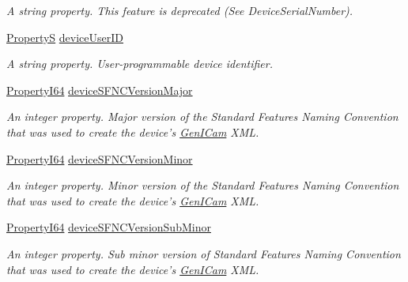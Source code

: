 \begin{DoxyCompactItemize}
\begin{DoxyCompactList}\small\item\em A string property. This feature is deprecated (See Device\+Serial\+Number). \end{DoxyCompactList}\item 
\hyperlink{classmv_i_m_p_a_c_t_1_1acquire_1_1_property_s}{Property\+S} \hyperlink{classmv_i_m_p_a_c_t_1_1acquire_1_1_gen_i_cam_1_1_device_control_a93c4d5949d939e7be9e663b78c53a67a}{device\+User\+I\+D}
\begin{DoxyCompactList}\small\item\em A string property. User-\/programmable device identifier. \end{DoxyCompactList}\item 
\hyperlink{group___common_interface_ga81749b2696755513663492664a18a893}{Property\+I64} \hyperlink{classmv_i_m_p_a_c_t_1_1acquire_1_1_gen_i_cam_1_1_device_control_ab9b1cb64c3dc9af2ec6f7a2c90a465ae}{device\+S\+F\+N\+C\+Version\+Major}
\begin{DoxyCompactList}\small\item\em An integer property. Major version of the Standard Features Naming Convention that was used to create the device's \hyperlink{namespacemv_i_m_p_a_c_t_1_1acquire_1_1_gen_i_cam}{Gen\+I\+Cam} X\+M\+L. \end{DoxyCompactList}\item 
\hyperlink{group___common_interface_ga81749b2696755513663492664a18a893}{Property\+I64} \hyperlink{classmv_i_m_p_a_c_t_1_1acquire_1_1_gen_i_cam_1_1_device_control_a941693542bcc2cda87f52d489e69c09c}{device\+S\+F\+N\+C\+Version\+Minor}
\begin{DoxyCompactList}\small\item\em An integer property. Minor version of the Standard Features Naming Convention that was used to create the device's \hyperlink{namespacemv_i_m_p_a_c_t_1_1acquire_1_1_gen_i_cam}{Gen\+I\+Cam} X\+M\+L. \end{DoxyCompactList}\item 
\hyperlink{group___common_interface_ga81749b2696755513663492664a18a893}{Property\+I64} \hyperlink{classmv_i_m_p_a_c_t_1_1acquire_1_1_gen_i_cam_1_1_device_control_a52d3bba7af5d4b694c7ae5ac0fb3d520}{device\+S\+F\+N\+C\+Version\+Sub\+Minor}
\begin{DoxyCompactList}\small\item\em An integer property. Sub minor version of Standard Features Naming Convention that was used to create the device's \hyperlink{namespacemv_i_m_p_a_c_t_1_1acquire_1_1_gen_i_cam}{Gen\+I\+Cam} X\+M\+L. \end{DoxyCompactList}\item 

\end{DoxyCompactItemize}
